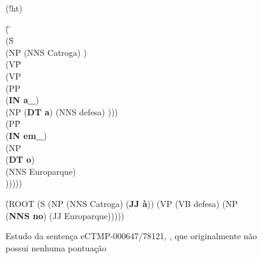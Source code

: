 \begin{figure}(!ht)
    \centering
    \begin{minipage}{.45\textwidth}
        \begin{tabbing}
            \=( \=\+\\
            \> (S\=\+\\ 
            \>  (NP (NNS Catroga) )\\
            \>  (VP\=\+\\ 
            \>   (VP\+\\ 
            \>    (PP\+\\ 
            \>     (\textbf{IN a\_})\\
            \>     (NP (\textbf{DT a}) (NNS defesa) )))\\
            \>   (PP\=\+\\ 
            \>    (\textbf{IN em\_})\\
            \>    (NP\+\\ 
            \>     (\textbf{DT o})\\
            \>     (NNS Europarque)\-\\
            \>    )))))
        \end{tabbing}
    \end{minipage}
    \begin{minipage}{.45\textwidth}
        \begin{tabbing}
            \=(ROOT
            \>  (S
            \>    (NP (NNS Catroga) (\textbf{JJ à}))
            \>    (VP (VB defesa)
            \>      (NP (\textbf{NNS no}) (JJ Europarque)))))
        \end{tabbing}
    \end{minipage}
    \caption[Estudo de caso CINTIL - Sentença transduzida sem pontuação]{Estudo da sentença eCTMP-000647/78121, , que originalmente não possui nenhuma pontuação}
    \label{fig:ec_cintil_sem_ponto_tree}
\end{figure}